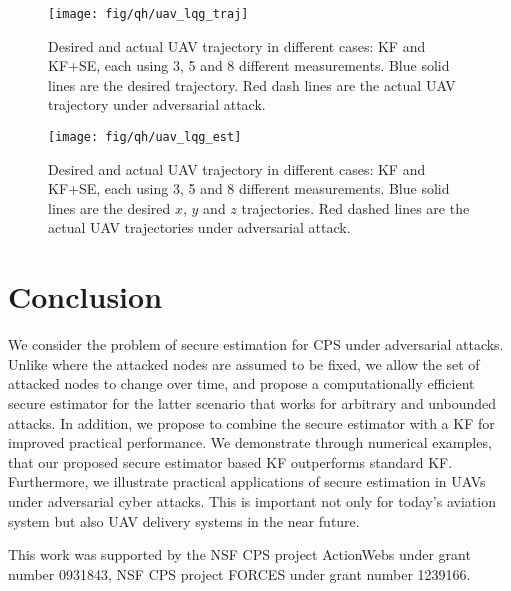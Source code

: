 \documentclass[twocolumn]{autart}    %
\newcommand{\rev}[1]{{\normalsize{{{\color{blue}#1}}}}}
\newcommand{\qie}[1]{{\normalsize{{{\color{magenta}#1}}}}}
\begin{document}
\begin{figure}
\center
\texttt{[image: fig/qh/uav\_lqg\_traj]}
\caption{Desired and actual UAV trajectory in different cases: KF and KF+SE, each using 3, 5 and 8 different measurements. Blue solid lines are the desired trajectory. Red dash lines are the actual UAV trajectory under adversarial attack.}
\label{fig:ex_uav_traj}
\end{figure}
\begin{figure}
\center
\texttt{[image: fig/qh/uav\_lqg\_est]}
\caption{Desired and actual UAV trajectory in different cases: KF and KF+SE, each using 3, 5 and 8 different measurements. Blue solid lines are the desired $x$, $y$ and $z$ trajectories. Red dashed lines are the actual UAV trajectories under adversarial attack.}
\label{fig:ex_uav_est}
\end{figure}
\vspace{-0.4cm}
\section{Conclusion}
\vspace{-0.4cm}
We consider the problem of secure estimation for CPS under adversarial attacks. Unlike \cite{Fawzi2014} where the attacked nodes are assumed to be fixed, we allow the set of attacked nodes to change over time, and propose a computationally efficient secure \rev{estimator} for the latter scenario that works for arbitrary and unbounded attacks. In addition, we propose to combine the secure \rev{estimator} with a KF for improved practical performance. We demonstrate through numerical examples, that our proposed secure estimator based KF outperforms standard KF. Furthermore, we illustrate practical applications of secure estimation in UAVs under adversarial cyber attacks. This is important not only for today's aviation system but also UAV delivery systems in the near future. 
%
%
%
%
\vspace{-0.8cm}
\begin{ack}     
\vspace{-0.4cm}                          %
This work was supported by the NSF CPS project ActionWebs under grant number 0931843, NSF CPS project FORCES under grant number
1239166.
\end{ack}

\end{document}
